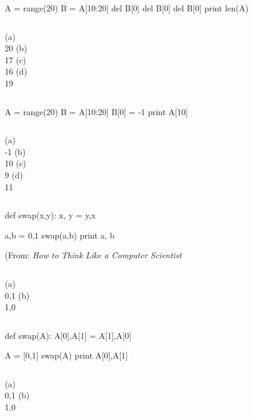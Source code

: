 \begin{frame}[fragile]
\begin{python}
A = range(20)
B = A[10:20]
del B[0]
del B[0]
del B[0]
print len(A)
\end{python}

\begin{columns}
(a)\\
20
(b)\\
17
(c)\\
16
(d)\\
19
\end{columns}
\end{frame}

\begin{frame}[fragile]
\begin{python}
A = range(20)
B = A[10:20]
B[0] = -1
print A[10]
\end{python}

\begin{columns}
(a)\\
-1
(b)\\
10
(c)\\
9
(d)\\
11
\end{columns}
\end{frame}

\begin{frame}[fragile]
\begin{python}
def swap(x,y):
    x, y = y,x

a,b = 0,1
swap(a,b)
print a, b
\end{python}

\begin{flushright}
(From: \textit{How to Think Like a Computer Scientist}
\end{flushright}

\begin{columns}
(a)\\
0,1
(b)\\
1,0
\end{columns}
\end{frame}


\begin{frame}[fragile]
\begin{python}
def swap(A):
    A[0],A[1] = A[1],A[0]

A = [0,1]
swap(A)
print A[0],A[1]
\end{python}

\begin{columns}
(a)\\
0,1
(b)\\
1,0
\end{columns}
\end{frame}

